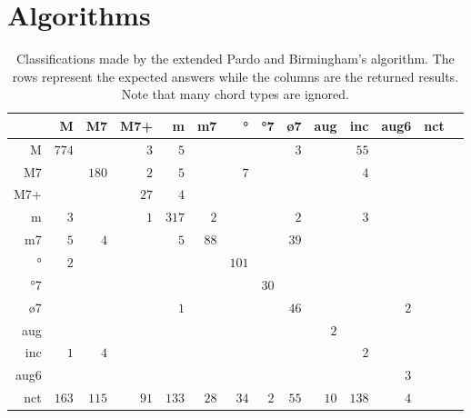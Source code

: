 \section{Algorithms}
\label{sec:algorithms}

\begin{table*}
\centering
\begin{tabular}{r||r|r|r|r|r|r|r|r|r|r|r|r|r}
      &     M &    M7 &   M7+ &     m &    m7 &    ° &   °7 &   ø7 &   aug &   inc &  aug6 &   nct \\  \hline \hline
    M & $ 774 $ & $     $ & $   3 $ & $   5 $ & $     $ & $     $ & $     $ & $   3 $ & $     $ & $  55 $ & $     $ & $     $ \\ \hline
   M7 & $     $ & $ 180 $ & $   2 $ & $   5 $ & $     $ & $   7 $ & $     $ & $     $ & $     $ & $   4 $ & $     $ & $     $ \\ \hline
  M7+ & $     $ & $     $ & $  27 $ & $   4 $ & $     $ & $     $ & $     $ & $     $ & $     $ & $     $ & $     $ & $     $ \\ \hline
    m & $   3 $ & $     $ & $   1 $ & $ 317 $ & $   2 $ & $     $ & $     $ & $   2 $ & $     $ & $   3 $ & $     $ & $     $ \\ \hline
   m7 & $   5 $ & $   4 $ & $     $ & $   5 $ & $  88 $ & $     $ & $     $ & $  39 $ & $     $ & $     $ & $     $ & $     $ \\ \hline
   ° & $   2 $ & $     $ & $     $ & $     $ & $     $ & $ 101 $ & $     $ & $     $ & $     $ & $     $ & $     $ & $     $ \\ \hline
  °7 & $     $ & $     $ & $     $ & $     $ & $     $ & $     $ & $  30 $ & $     $ & $     $ & $     $ & $     $ & $     $ \\ \hline
  ø7 & $     $ & $     $ & $     $ & $   1 $ & $     $ & $     $ & $     $ & $  46 $ & $     $ & $     $ & $   2 $ & $     $ \\ \hline
  aug & $     $ & $     $ & $     $ & $     $ & $     $ & $     $ & $     $ & $     $ & $   2 $ & $     $ & $     $ & $     $ \\ \hline
  inc & $   1 $ & $   4 $ & $     $ & $     $ & $     $ & $     $ & $     $ & $     $ & $     $ & $   2 $ & $     $ & $     $ \\ \hline
 aug6 & $     $ & $     $ & $     $ & $     $ & $     $ & $     $ & $     $ & $     $ & $     $ & $     $ & $   3 $ & $     $ \\ \hline
  nct & $ 163 $ & $ 115 $ & $  91 $ & $ 133 $ & $  28 $ & $  34 $ & $   2 $ & $  55 $ & $  10 $ & $ 138 $ & $   4 $ & $     $ \\ \hline
\end{tabular}

\caption{Classifications made by the extended Pardo and Birmingham's algorithm. The rows represent
  the expected answers while the columns are the returned
  results. Note that many chord types are ignored.}
\label{tab:erros-ES-pb}
\end{table*}

